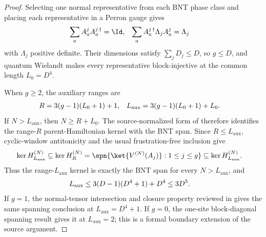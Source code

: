 \begin{proof}
    \leanok
    Selecting one normal representative from each BNT phase class and placing
    each representative in a Perron gauge gives
    \begin{align}
        \sum_a A^j_a A^{j\,\dagger}_a          & =\Id,
                                               &
        \sum_a A^{j\,\dagger}_a\Lambda_j A^j_a & =\Lambda_j
        \notag
    \end{align}
    with $\Lambda_j$ positive definite. Their dimensions satisfy
    $\sum_jD_j\leq D$, so $g\leq D$, and quantum Wielandt makes every
    representative block-injective at the common length $L_0=D^4$.

    When $g\geq2$, the auxiliary ranges are
    \begin{align}
        R                & =3(g-1)(L_0+1)+1,
                         &
        L_{\mathrm{aux}} & =3(g-1)(L_0+1)+L_0.
        \notag
    \end{align}
    If $N>L_{\mathrm{aux}}$, then $N\geq R+L_0$. The source-normalized
    form of \cite[Theorem~12]{PerezGarcia2007Matrix} therefore identifies
    the range-$R$ parent-Hamiltonian kernel with the BNT span. Since
    $R\leq L_{\mathrm{aux}}$, cyclic-window antitonicity and the usual
    frustration-free inclusion give
    \begin{align}
        \ker H_{L_{\mathrm{aux}}}^{(N)}
         & \subseteq \ker H_R^{(N)}
        =\spn\{\ket{V^{(N)}(A_j)}:1\leq j\leq g\}
        \subseteq \ker H_{L_{\mathrm{aux}}}^{(N)}.
        \notag
    \end{align}
    Thus the range-$L_{\mathrm{aux}}$ kernel is exactly the BNT span for
    every $N>L_{\mathrm{aux}}$, and
    \begin{align}
        L_{\mathrm{aux}}
         & \leq 3(D-1)(D^4+1)+D^4
        \leq 3D^5.
        \notag
    \end{align}
    If $g=1$, the normal-tensor intersection and closure property reviewed in
    \cite[Section~IV.C]{Cirac2021Matrix} gives the same spanning conclusion at
    $L_{\mathrm{aux}}=D^4+1$. If $g=0$,
    the one-site block-diagonal spanning result gives it at
    $L_{\mathrm{aux}}=2$; this is a formal boundary extension of the source
    argument.


\end{proof}
